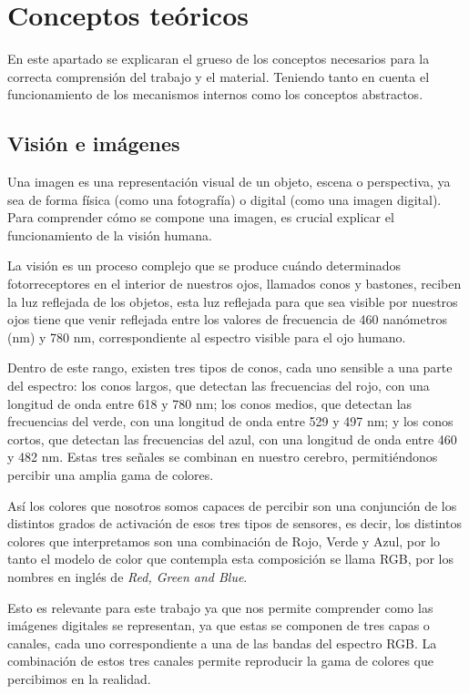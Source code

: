 \chapter{Conceptos teóricos}

En este apartado se explicaran el grueso de los conceptos necesarios para la correcta comprensión del trabajo y el material. Teniendo tanto en cuenta el funcionamiento de los mecanismos internos como los conceptos abstractos.

\section{Visión e imágenes}
Una imagen es una representación visual de un objeto, escena o perspectiva, ya sea de forma física (como una fotografía) o digital (como una imagen digital). Para comprender cómo se compone una imagen, es crucial explicar el funcionamiento de la visión humana.

La visión \cite{formaciongraficaModeloRGB} es un proceso complejo que se produce cuándo determinados fotorreceptores en el interior de nuestros ojos, llamados conos y bastones, reciben la luz reflejada de los objetos, esta luz reflejada para que sea visible por nuestros ojos tiene que venir reflejada entre los valores de frecuencia de 460 nanómetros (nm) y 780 nm, correspondiente al espectro visible para el ojo humano. 

Dentro de este rango, existen tres tipos de conos, cada uno sensible a una parte del espectro: los conos largos, que detectan las frecuencias del rojo, con una longitud de onda entre 618 y 780 nm; los conos medios, que detectan las frecuencias del verde, con una longitud de onda entre 529 y 497 nm; y los conos cortos, que detectan las frecuencias del azul, con una longitud de onda entre 460 y 482 nm. Estas tres señales se combinan en nuestro cerebro, permitiéndonos percibir una amplia gama de colores.

Así los colores que nosotros somos capaces de percibir son una conjunción de los distintos grados de activación de esos tres tipos de sensores, es decir, los distintos colores que interpretamos son una combinación de Rojo, Verde y Azul, por lo tanto el modelo de color que contempla esta composición se llama RGB, por los nombres en inglés de \textit{Red, Green and Blue}.

Esto es relevante para este trabajo ya que nos permite comprender como las imágenes digitales se representan, ya que estas se componen de tres capas o canales, cada uno correspondiente a una de las bandas del espectro RGB. La combinación de estos tres canales permite reproducir la gama de colores que percibimos en la realidad.

